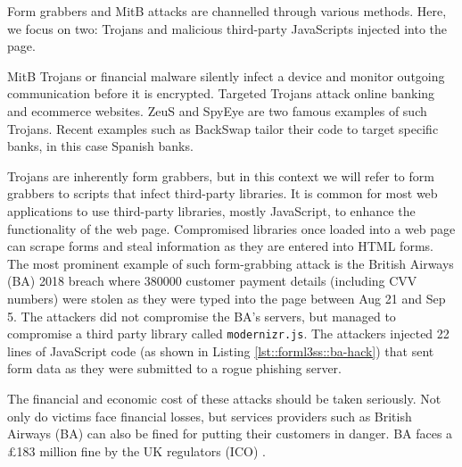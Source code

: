 Form grabbers and MitB attacks are channelled through various methods. Here, we focus on two: Trojans and malicious third-party JavaScripts injected into the page.

MitB Trojans or financial malware silently infect a device and monitor outgoing communication before it is encrypted. Targeted Trojans attack online banking and ecommerce websites. ZeuS and SpyEye are two famous examples of such Trojans. Recent examples such as BackSwap \cite{kessem_backswap_2018} tailor their code to target specific banks, in this case Spanish banks.

Trojans are inherently form grabbers, but in this context we will refer to form grabbers to scripts that infect third-party libraries. It is common for most web applications to use third-party libraries, mostly JavaScript, to enhance the functionality of the web page. Compromised libraries once loaded into a web page can scrape forms and steal information as they are entered into HTML forms. The most prominent example of such form-grabbing attack is the British Airways (BA) 2018 breach \cite{noauthor_how_nodate} where \num{380000} customer payment details (including CVV numbers) were stolen as they were typed into the page between Aug 21 and Sep 5. The attackers did not compromise the BA's servers, but managed to compromise a third party library called \texttt{modernizr.js}. The attackers injected 22 lines of JavaScript code \cite{j_schwartz_riskiq_nodate} (as shown in Listing \ref{lst::forml3ss::ba-hack}) that sent form data as they were submitted to a rogue phishing server.
The financial and economic cost of these attacks should be taken seriously. Not only do victims face financial losses, but services providers such as British Airways (BA) can also be fined for putting their customers in danger. BA faces a £183 million fine by the UK regulators (ICO) \cite{noauthor_british_2019}.

